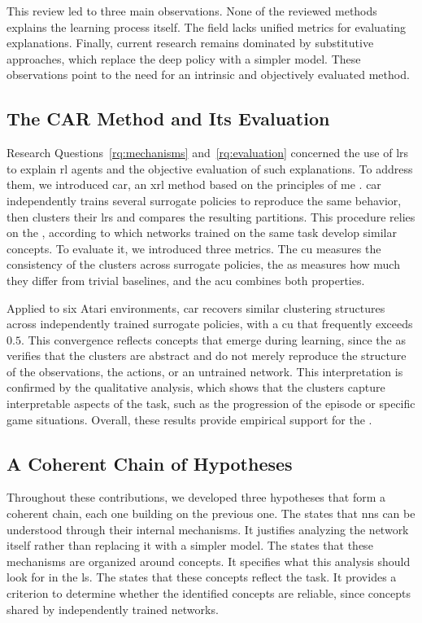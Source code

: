 This review led to three main observations.
None of the reviewed methods explains the learning process itself.
The field lacks unified metrics for evaluating explanations.
Finally, current research remains dominated by substitutive approaches, which replace the deep policy with a simpler model.
These observations point to the need for an intrinsic and objectively evaluated method.

\subsection{The CAR Method and Its Evaluation}

Research Questions~\ref{rq:mechanisms} and~\ref{rq:evaluation} concerned the use of \glspl{lr} to explain \gls{rl} agents and the objective evaluation of such explanations.
To address them, we introduced \gls{car}, an \gls{xrl} method based on the principles of \gls{me} \parencite{alaarabiou2026car}.
\gls{car} independently trains several surrogate policies to reproduce the same behavior, then clusters their \glspl{lr} and compares the resulting partitions.
This procedure relies on the \RepresentationConvergenceHypothesisName, according to which networks trained on the same task develop similar concepts.
To evaluate it, we introduced three metrics.
The \gls{cu} measures the consistency of the clusters across surrogate policies, the \gls{as} measures how much they differ from trivial baselines, and the \gls{acu} combines both properties.

Applied to six Atari environments, \gls{car} recovers similar clustering structures across independently trained surrogate policies, with a \gls{cu} that frequently exceeds $0.5$.
This convergence reflects concepts that emerge during learning, since the \gls{as} verifies that the clusters are abstract and do not merely reproduce the structure of the observations, the actions, or an untrained network.
This interpretation is confirmed by the qualitative analysis, which shows that the clusters capture interpretable aspects of the task, such as the progression of the episode or specific game situations.
Overall, these results provide empirical support for the \RepresentationConvergenceHypothesisName.

\subsection{A Coherent Chain of Hypotheses}

Throughout these contributions, we developed three hypotheses that form a coherent chain, each one building on the previous one.
The \MechanisticHypothesisName states that \glspl{nn} can be understood through their internal mechanisms.
It justifies analyzing the network itself rather than replacing it with a simpler model.
The \ConceptHypothesisName states that these mechanisms are organized around concepts.
It specifies what this analysis should look for in the \gls{ls}.
The \RepresentationConvergenceHypothesisName states that these concepts reflect the task.
It provides a criterion to determine whether the identified concepts are reliable, since concepts shared by independently trained networks.

